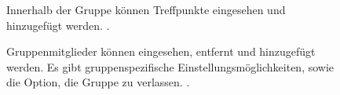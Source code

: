 \documentclass[parskip=full,11pt]{scrartcl}
\begin{document}
\begin{figure}[hb]
		\caption{\label{fig:map}
			Innerhalb der Gruppe können Treffpunkte eingesehen und hinzugefügt werden.
			.
		}
\end{figure}

\begin{figure}[hb]
		\caption{\label{fig:map}
			Gruppenmitglieder können eingesehen, entfernt und hinzugefügt werden.
			Es gibt gruppenspezifische Einstellungsmöglichkeiten, sowie die Option,
			die Gruppe zu verlassen.
			.
		}
\end{figure}
\end{document}

